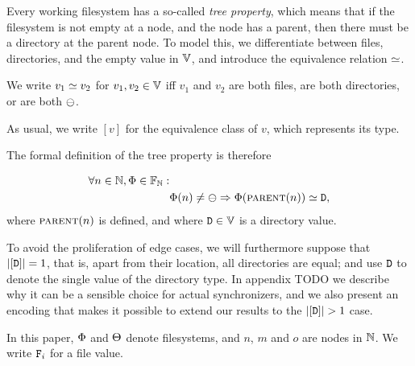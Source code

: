 Every working filesystem has a so-called \emph{tree property}, which means that
if the filesystem is not empty at a node, and the node has a parent,
then there must be a directory at the parent node.
To model this, we differentiate between files, directories, and the
empty value in $\mathbb{V}$, and introduce the equivalence relation
$\simeq$.

\begin{mydef}
We write $v_1\simeq v_2$ for $v_1,v_2\in\mathbb{V}$ iff $v_1$ and $v_2$ are both files,
are both directories, or are both $\ominus$.
\end{mydef}

As usual, we write $[v]$ for the equivalence class of $v$, which represents its type.

The formal definition of the tree property is therefore
\begin{mydef}
\begin{align*}
\forall n\in\mathbb{N}, \Phi\in\mathbb{F}_{\mathbb{N}}:& \\
& \Phi(n) \neq \ominus \Rightarrow \Phi(\text{\normalfont\scshape{parent}}(n)) \simeq \mathtt{D},
\end{align*}
where $\text{\normalfont\scshape{parent}}(n)$ is defined, and where $\mathtt{D}\in\mathbb{V}$ is a directory value.
\end{mydef}

To avoid the proliferation of edge cases, we will furthermore suppose that
$|[\mathtt{D}]|=1$, that is, apart from their location, all directories are equal;
and use $\mathtt{D}$ to denote the single value of the directory type.
In appendix TODO we describe why it can be a sensible choice
for actual synchronizers, and we also present an encoding that makes it possible
to extend our results to the $|\setd|>1$ case.


In this paper, $\Phi$ and $\Theta$ denote filesystems,
and $n$, $m$ and $o$ are nodes in $\mathbb{N}$.
We write $\mathtt{F}_i$ for a file value. %

